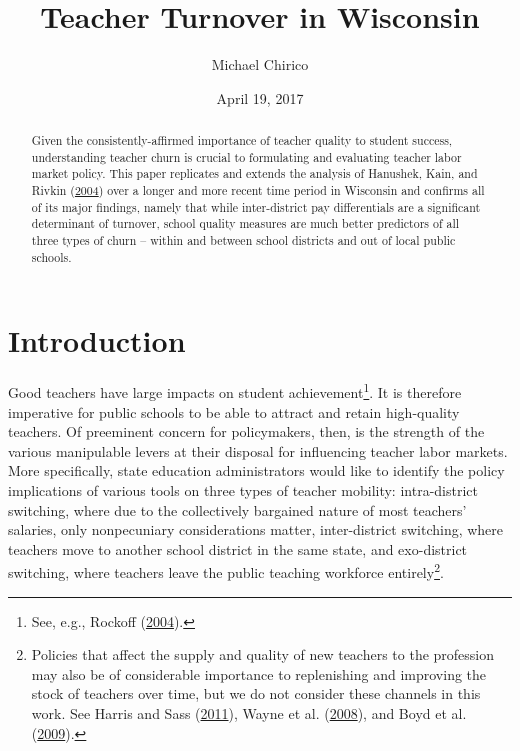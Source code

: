 \documentclass[12pt,]{article}
\title{Teacher Turnover in Wisconsin}
\author{Michael Chirico}
\date{April 19, 2017}
\let\rmarkdownfootnote\footnote%
\def\footnote{\protect\rmarkdownfootnote}
\begin{document}
\maketitle
\begin{abstract}
Given the consistently-affirmed importance of teacher quality to student
success, understanding teacher churn is crucial to formulating and
evaluating teacher labor market policy. This paper replicates and
extends the analysis of Hanushek, Kain, and Rivkin
(\protect\hyperlink{ref-hanushek}{2004}) over a longer and more recent
time period in Wisconsin and confirms all of its major findings, namely
that while inter-district pay differentials are a significant
determinant of turnover, school quality measures are much better
predictors of all three types of churn -- within and between school
districts and out of local public schools.
\end{abstract}

\section{Introduction}\label{introduction}

Good teachers have large impacts on student achievement\footnote{See,
  e.g., Rockoff (\protect\hyperlink{ref-rockoff}{2004}).}. It is
therefore imperative for public schools to be able to attract and retain
high-quality teachers. Of preeminent concern for policymakers, then, is
the strength of the various manipulable levers at their disposal for
influencing teacher labor markets. More specifically, state education
administrators would like to identify the policy implications of various
tools on three types of teacher mobility: intra-district switching,
where due to the collectively bargained nature of most teachers'
salaries, only nonpecuniary considerations matter, inter-district
switching, where teachers move to another school district in the same
state, and exo-district switching, where teachers leave the public
teaching workforce entirely\footnote{Policies that affect the supply and
  quality of new teachers to the profession may also be of considerable
  importance to replenishing and improving the stock of teachers over
  time, but we do not consider these channels in this work. See Harris
  and Sass (\protect\hyperlink{ref-harris}{2011}), Wayne et al.
  (\protect\hyperlink{ref-wayne}{2008}), and Boyd et al.
  (\protect\hyperlink{ref-boyd2009}{2009}).}.
\end{document}
